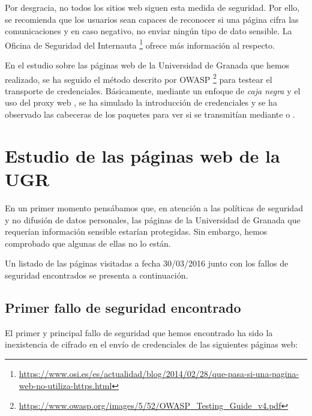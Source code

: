 Por desgracia, no todos los sitios web siguen esta medida de seguridad. Por ello, se recomienda que los usuarios sean capaces de reconocer si una página cifra las comunicaciones y en caso negativo, no enviar ningún tipo de dato sensible. La Oficina de Seguridad del Internauta \footnote{\url{https://www.osi.es/es/actualidad/blog/2014/02/28/que-pasa-si-una-pagina-web-no-utiliza-https.html}} ofrece más información al respecto.

En el estudio sobre las páginas web de la Universidad de Granada que hemos realizado, se ha seguido el método descrito por OWASP  \footnote{\url{https://www.owasp.org/images/5/52/OWASP_Testing_Guide_v4.pdf}} para testear el transporte de credenciales. Básicamente, mediante un enfoque de \emph{caja negra} y
el uso del proxy web , se ha simulado la introducción de credenciales y se ha observado las cabeceras de los paquetes para ver si se transmitían mediante  o .

\section{Estudio de las páginas web de la UGR}

En un primer momento pensábamos que, en atención a las políticas de seguridad y no difusión de datos personales, las páginas de la Universidad de Granada que requerían información sensible estarían protegidas. Sin embargo, hemos comprobado que algunas de ellas no lo están.

Un listado de las páginas visitadas a fecha 30/03/2016 junto con los fallos de seguridad encontrados se presenta a continuación.

\subsection{Primer fallo de seguridad encontrado}

El primer y principal fallo de seguridad que hemos encontrado ha sido la inexistencia de cifrado en el envío de credenciales de las siguientes páginas web:

